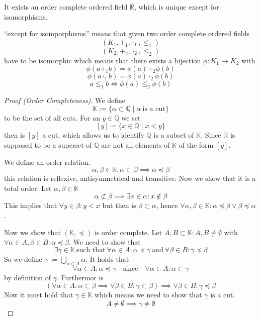 \begin{theorem}
   It exists an order complete ordered field \(\mathbb{R}\), which is unique except for isomorphisms.
\end{theorem}
\begin{remark}
   ``except for isomporphisms'' means that given two order complete ordered fields
   \[(K_1, +_1, \cdot_1, \leq_1)\]
   \[(K_2, +_2, \cdot_2, \leq_2)\]
   have to be isomorphic which means that there exists a bijection \(\phi: K_1 \to K_2\) with
   \[\phi(a +_1 b) = \phi(a) +_2 \phi(b)\]
   \[\phi(a \cdot_1 b) = \phi(a) \cdot_2 \phi(b)\]
   \[a \leq_1 b \iff \phi(a) \leq_2 \phi(b)\]
\end{remark}
\begin{proof}[Proof (Order Completeness)]
   We define
   \[\mathbb{K} := \{\alpha \subset \mathbb{Q} \mid \alpha~\text{is a cut}\}\]
   to be the set of all cuts.
   For an \(y \in \mathbb{Q}\) we set
   \[[y] = \{x \in \mathbb{Q} \mid x < y\}\]
   then is \([y]\) a cut, which allows us to identify \(\mathbb{Q}\) is a subset of \(\mathbb{K}\).
   Since \(\mathbb{R}\) is supposed to be a superset of \(\mathbb{Q}\) are not all elements of \(\mathbb{K}\) of the form \([y]\).

   We define an order relation.
   \[\alpha, \beta \in \mathbb{K}: \alpha \subset \beta \implies \alpha \preceq \beta\]
   this relation is reflexive, antisymmetrical and transitive.
   Now we show that it is a total order.
   Let \(\alpha, \beta \in \mathbb{K}\)
   \[\alpha \not\subset \beta \implies \exists x \in \alpha: x \not\in \beta\]
   This implies that \(\forall y \in \beta: y < x\) but then is \(\beta \subset \alpha\), hence \(\forall \alpha, \beta \in \mathbb{K}: \alpha \preceq \beta \lor \beta \preceq \alpha\).

   Now we show that \((\mathbb{K}, \preceq)\) is order complete.
   Let \(A, B \subset \mathbb{K}: A, B \neq \emptyset\) with \(\forall \alpha \in A, \beta \in B: \alpha \preceq \beta\).
   We need to show that
   \[\exists \gamma \in \mathbb{K}~\text{such that}~\forall \alpha \in A: \alpha \preceq \gamma~\text{and}~\forall \beta \in B: \gamma \preceq \beta\]
   So we define \(\gamma := \bigcup_{\alpha \in A} \alpha\).
   It holds that
   \[\forall \alpha \in A: \alpha \preceq \gamma \quad\text{since}\quad \forall \alpha \in A: \alpha \subset \gamma\]
   by definition of \(\gamma\).
   Furthermor is
   \[(\forall \alpha \in A: \alpha \subset \beta \implies \forall \beta \in B: \gamma \subset \beta) \implies \forall \beta \in B: \gamma \preceq \beta\]
   Now it must hold that \(\gamma \in \mathbb{K}\) which means we need to show that \(\gamma\) is a cut.
   \[A \neq \emptyset \implies \gamma \neq \emptyset\]


\end{proof}
